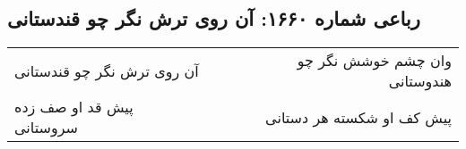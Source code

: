\begin{center}
\section*{رباعی شماره ۱۶۶۰: آن روی ترش نگر چو قندستانی}
\label{sec:1660}
\begin{longtable}{l p{0.5cm} r}
آن روی ترش نگر چو قندستانی
&&
وان چشم خوشش نگر چو هندوستانی
\\
پیش قد او صف زده سروستانی
&&
پیش کف او شکسته هر دستانی
\\
\end{longtable}
\end{center}
